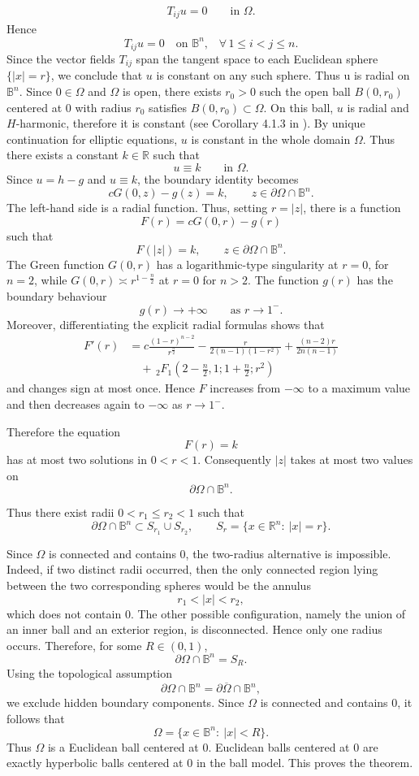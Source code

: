 \documentclass[12pt]{amsart}
\numberwithin{equation}{section}
\newcommand{\Bn}{\mathbb B^n}
\theoremstyle{plain}
\numberwithin{equation}{section}
\numberwithin{theorem}{section}
\numberwithin{proposition}{section}
\begin{document}
\begin{eqnarray}\label{Tijuglobal} T_{ij}u=0
\qquad\text{in }\Omega.
\end{eqnarray}
Hence
\[
T_{ij}u=0
\quad\text{on $\mathbb B^n$,}\quad\forall\,1\le i<j\le n.
\]
Since the vector fields \(T_{ij}\) span the tangent space to each Euclidean
sphere \(\{|x|=r\}\), we conclude that \(u\) is constant on any such sphere. Thus u is radial on $\mathbb B^n$.
Since \(0\in\Omega\) and \(\Omega\) is open, there exists \(r_0>0\) such the open ball  $B(0,r_0)$ centered at $0$ with radius  \(r_0\) 
satisfies 
$
B(0,r_0)\subset \Omega.$
On this ball, \(u\) is radial and  \(H\)-harmonic, therefore it is constant (see Corollary 4.1.3 in \cite{St}). By unique continuation for elliptic equations, \(u\) is constant in the whole
domain \(\Omega\).
 Thus there exists a constant \(k\in\mathbb R\)
such that
\[
u\equiv k
\qquad\text{in }\Omega.
\]
Since \(u=h-g\) and \(u\equiv k\), the boundary identity becomes
\[
cG(0,z)-g(z)=k,
\qquad z\in\partial\Omega\cap\Bn.
\]
The left-hand side is a radial function. Thus, setting \(r=|z|\), there is a
function
\[
F(r)=cG(0,r)-g(r)
\]
such that
\[
F(|z|)=k,
\qquad z\in\partial\Omega\cap\Bn.
\]
 The Green function
\(G(0,r)\) has a logarithmic-type singularity at \(r=0\), for $n = 2$, while \(G(0,r) \asymp r^{1-\frac{n}{2}}\) at $r =0$ for $n>2.$ The function
\(g(r)\) has the boundary behaviour
\[
g(r)\to+\infty
\qquad\text{as }r\to1^-.
\]
Moreover, differentiating the explicit radial formulas shows that
\begin{align*}
F'(r)&= c\frac{(1-r)^{n-2}}{r^{\frac{n}{2}}} - \frac{r}{2(n-1)(1-r^2)}
+
\frac{(n-2)r}{2n(n-1)}\\
&\quad+\,{}_2F_1\left(
2-\frac n2,1;
1+\frac n2;
r^2
\right)
\end{align*}
and changes sign at most once. Hence \(F\) increases from
\(-\infty\) to a maximum value and then decreases again to \(-\infty\) as
\(r\to1^-\).

Therefore the equation
\[
F(r)=k
\]
has at most two solutions in \(0<r<1\). Consequently \(|z|\) takes at most two
values on
\[
\partial\Omega\cap\mathbb B^n.
\]



Thus there exist radii \(0<r_1\le r_2<1\) such that
\[
\partial\Omega\cap\mathbb B^n
\subset
S_{r_1}\cup S_{r_2},
\qquad
S_r=\{x\in\mathbb R^n:\ |x|=r\}.
\]

Since \(\Omega\) is connected and contains \(0\), the two-radius alternative is
impossible. Indeed, if two distinct radii occurred, then the only connected
region lying between the two corresponding spheres would be the annulus
\[
r_1<|x|<r_2,
\]
which does not contain \(0\). The other possible configuration, namely the
union of an inner ball and an exterior region, is disconnected. Hence only one
radius occurs.
Therefore, for some \(R\in(0,1)\),
\[
\partial\Omega\cap\Bn=S_R.
\]
Using the topological assumption
\[
\partial\Omega\cap\Bn
=
\partial\overline{\Omega}\cap\Bn,
\]
we exclude hidden boundary components. Since \(\Omega\) is connected and
contains \(0\), it follows that
\[
\Omega=\{x\in\Bn:\ |x|<R\}.
\]
Thus \(\Omega\) is a Euclidean ball centered at \(0\). Euclidean balls centered
at \(0\) are exactly hyperbolic balls centered at \(0\) in the ball model.
This proves the theorem.
\end{document}

